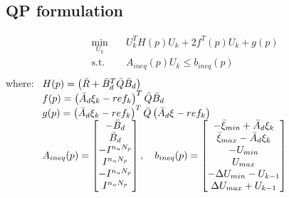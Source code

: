 \documentclass[12pt]{article}
\begin{document}
        \subsection{QP formulation}
            \begin{equation}
                \begin{aligned}
                    \min_{U_k} \quad & U_k^T H(p) U_k + 2 f^T(p) U_k + g(p)   \\
                    \textrm{s.t.} \quad & A_{ineq}(p) U_k \leq b_{ineq}(p)  \\
                \end{aligned}
            \end{equation}
            where:  $ \begin{array}[t]{l}
                        H(p) = \left( \bar{R} + \bar{B}_d^T \bar{Q} \bar{B}_d \right) \\
                        f(p) = \left( \bar{A}_d \xi_{k} - ref_{k} \right)^T \bar{Q} \bar{B}_d \\
                        g(p) = \left( \bar{A}_d \xi_{k} - ref_{k} \right)^T \bar{Q} \left( \bar{A}_d \xi - ref_{k} \right) \\
                        A_{ineq}(p) =   \begin{bmatrix} 
                                            -\bar{B}_d \\ \bar{B}_d \\ -I^{n_u N_p} \\ I^{n_u N_p} \\ -I^{n_u N_p} \\ I^{n_u N_p}
                                        \end{bmatrix},
                        \quad
                        b_{ineq}(p) =   \begin{bmatrix} 
                                            -\bar{\xi}_{min} + \bar{A}_d \xi_{k} \\ 
                                            \bar{\xi}_{max} - \bar{A}_d \xi_{k} \\
                                            -U_{min} \\
                                            U_{max} \\
                                            -\Delta U_{min} - U_{k-1} \\
                                            \Delta U_{max} + U_{k-1} \\
                                        \end{bmatrix} \\
                    \end{array} $
\end{document}
